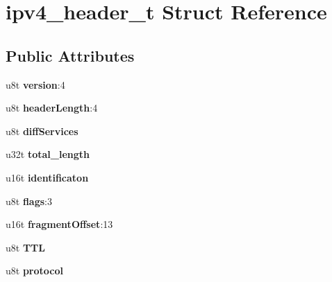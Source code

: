 \hypertarget{structipv4__header__t}{}\section{ipv4\+\_\+header\+\_\+t Struct Reference}
\label{structipv4__header__t}
\subsection*{Public Attributes}
\begin{DoxyCompactItemize}
\item 
\mbox{\label{structipv4__header__t_ac188d1ae5ea19139be084aabea16ecb1}} 
u8t {\bfseries version}\+:4
\item 
\mbox{\label{structipv4__header__t_ac11ce6acd566bf026316c761fc9532fd}} 
u8t {\bfseries header\+Length}\+:4
\item 
\mbox{\label{structipv4__header__t_a55f855624993b828721755ec8942256d}} 
u8t {\bfseries diff\+Services}
\item 
\mbox{\label{structipv4__header__t_a3503c52bc9b72749fb422fa108dd15f8}} 
u32t {\bfseries total\+\_\+length}
\item 
\mbox{\label{structipv4__header__t_a039763ed73f6968b0a6cecf4f144fe85}} 
u16t {\bfseries identificaton}
\item 
\mbox{\label{structipv4__header__t_a7865e9fdc047af71d5bf561256bc5081}} 
u8t {\bfseries flags}\+:3
\item 
\mbox{\label{structipv4__header__t_a5b4f68e31a631a875b616d6c389936ce}} 
u16t {\bfseries fragment\+Offset}\+:13
\item 
\mbox{\label{structipv4__header__t_a43c20799b97f008f7eb1226329078b89}} 
u8t {\bfseries T\+TL}
\item 
\mbox{\label{structipv4__header__t_abcb115504415c8546c24394f44037f5f}} 
u8t {\bfseries protocol}
\item 

\end{DoxyCompactItemize}
